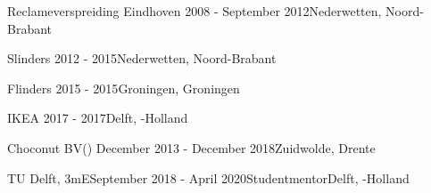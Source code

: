 \begin{rSection}{}

    {%
        \begin{experienceItem}
            {Reclameverspreiding Eindhoven}{ 2008 - September 2012}{}{Nederwetten, Noord-Brabant}
    \end{experienceItem}}{}

    {%
        \begin{experienceItem}
            {Slinders}{ 2012 -  2015}{{}}{Nederwetten, Noord-Brabant}
        \end{experienceItem}
    }{}

    {%
        \begin{experienceItem}
            {Flinders}{ 2015 -  2015}{}{Groningen, Groningen}
        \end{experienceItem} 

        \begin{experienceItem}
            {IKEA}{ 2017 -  2017}{}{Delft, -Holland}
    \end{experienceItem}}{}


    {%
        \begin{experienceItem}
            {Choconut BV}{() December 2013 - December 2018}{}{Zuidwolde, Drente}
    \end{experienceItem}}{}

    \begin{experienceItem}
        {TU Delft, 3mE}{September 2018 - April 2020}{Studentmentor}{Delft, -Holland}
    \end{experienceItem}


\end{rSection}
